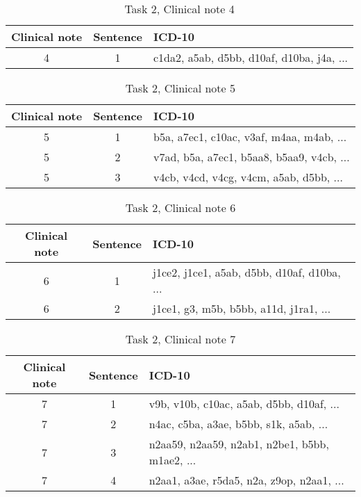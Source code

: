 \begin{table}[htbp] \footnotesize \center
\caption{Task 2, Clinical note 4 \label{tab:t2c4}}
\begin{tabularx}{\textwidth}{c c X}
    \toprule
    Clinical note & Sentence & ICD-10 \\
    \midrule
	 4 & 1 & c1da2, a5ab, d5bb, d10af, d10ba, j4a, ... \\
	\bottomrule
\end{tabularx}
\end{table}


\begin{table}[htbp] \footnotesize \center
\caption{Task 2, Clinical note 5 \label{tab:t2c5}}
\begin{tabularx}{\textwidth}{c c X}
    \toprule
    Clinical note & Sentence & ICD-10 \\
    \midrule
	 5 & 1 & b5a, a7ec1, c10ac, v3af, m4aa, m4ab, ... \\
	 5 & 2 & v7ad, b5a, a7ec1, b5aa8, b5aa9, v4cb, ... \\
	 5 & 3 & v4cb, v4cd, v4cg, v4cm, a5ab, d5bb, ... \\
	\bottomrule
\end{tabularx}
\end{table}


\begin{table}[htbp] \footnotesize \center
\caption{Task 2, Clinical note 6 \label{tab:t2c6}}
\begin{tabularx}{\textwidth}{c c X}
    \toprule
    Clinical note & Sentence & ICD-10 \\
    \midrule
	 6 & 1 & j1ce2, j1ce1, a5ab, d5bb, d10af, d10ba, ... \\
	 6 & 2 & j1ce1, g3, m5b, b5bb, a11d, j1ra1, ... \\
	\bottomrule
\end{tabularx}
\end{table}


\begin{table}[htbp] \footnotesize \center
\caption{Task 2, Clinical note 7 \label{tab:t2c7}}
\begin{tabularx}{\textwidth}{c c X}
    \toprule
    Clinical note & Sentence & ICD-10 \\
    \midrule
	 7 & 1 & v9b, v10b, c10ac, a5ab, d5bb, d10af, ... \\
	 7 & 2 & n4ac, c5ba, a3ae, b5bb, s1k, a5ab, ... \\
	 7 & 3 & n2aa59, n2aa59, n2ab1, n2be1, b5bb, m1ae2, ... \\
	 7 & 4 & n2aa1, a3ae, r5da5, n2a, z9op, n2aa1, ... \\
	\bottomrule
\end{tabularx}
\end{table}


